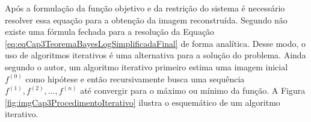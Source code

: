 {{%
%
%
%
%
%
%
%
%


Após a formulação da função objetivo e da restrição do sistema é necessário resolver essa equação para a obtenção da imagem reconstruída. Segundo  não existe uma fórmula fechada para a resolução da Equação \ref{eq:eqCap3TeoremaBayesLogSimplificadaFinal} de forma analítica. Desse modo, o uso de algoritmos iterativos é uma alternativa para a solução do problema. Ainda segundo o autor, um algoritmo iterativo primeiro estima uma imagem inicial $f^{(0)}$ como hipótese e então recursivamente busca uma sequência $f^{(1)}, f^{(2)}, \dots , f^{(n)}$ até convergir para o máximo ou mínimo da função. A Figura \ref{fig:imgCap3ProcedimentoIterativo} ilustra o esquemático de um algoritmo iterativo.


}}
